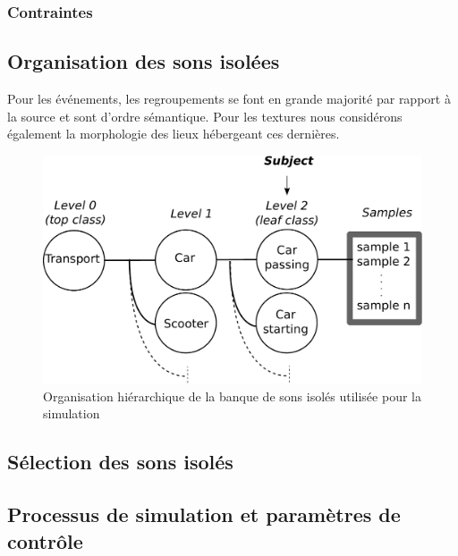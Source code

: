 \subsubsection{Contraintes}

\subsection{Organisation des sons isolées}
\label{db_ui}

Pour les événements, les regroupements se font en grande majorité par rapport à la source et sont d’ordre sémantique. Pour les textures nous considérons également la morphologie des lieux hébergeant ces dernières.

\begin{figure}[bth]
        \myfloatalign
        \includegraphics[width=.8\linewidth]{gfx/3-eps-converted-to}
       \caption{Organisation hiérarchique de la banque de sons isolés utilisée pour la simulation}\label{fig:orgDb}
\end{figure}

\subsection{Sélection des sons isolés}

\subsection{Processus de simulation et paramètres de contrôle}


